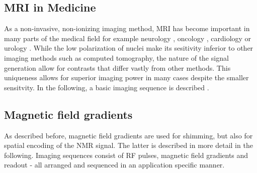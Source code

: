         \subsection{MRI in Medicine}
        As a non-invasive, non-ionizing imaging method, MRI has become important in many parts of the medical field for example neurology \cite{frisoni_clinical_2010}, oncology \cite{padhani_dynamic_2002}, cardiology \cite{constantine_role_2004} or urology \cite{stoianovici_mri_2007}. While the low polarization of nuclei make its sesitivity inferior to other imaging methods such as computed tomography, the nature of the signal generation allow for contrasts that differ vastly from other methods. This uniqueness allows for superior imaging power in many cases despite the smaller sensitvity. In the following, a basic imaging sequence is described \cite{noauthor_wiley-vch_nodate}.
        \subsection{Magnetic field gradients}
        As described before, magnetic field gradients are used for shimming, but also for spatial encoding of the NMR signal. The latter is described in more detail in the following. Imaging sequences consist of RF pulses, magnetic field gradients and readout - all arranged and sequenced in an application specific manner.
